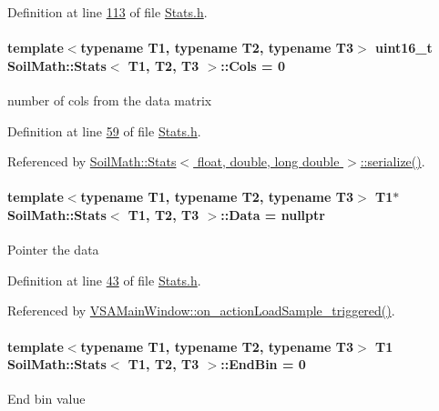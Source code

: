 Definition at line \hyperlink{_stats_8h_source_l00113}{113} of file \hyperlink{_stats_8h_source}{Stats.\+h}.

\hypertarget{class_soil_math_1_1_stats_a971f1ec23c32137805c4577f05454d83}{}
\paragraph[{Cols}]{\setlength{\rightskip}{0pt plus 5cm}template$<$typename T1, typename T2, typename T3$>$ uint16\+\_\+t {\bf Soil\+Math\+::\+Stats}$<$ T1, T2, T3 $>$\+::Cols = 0}\label{class_soil_math_1_1_stats_a971f1ec23c32137805c4577f05454d83}
number of cols from the data matrix 

Definition at line \hyperlink{_stats_8h_source_l00059}{59} of file \hyperlink{_stats_8h_source}{Stats.\+h}.



Referenced by \hyperlink{_stats_8h_source_l00651}{Soil\+Math\+::\+Stats$<$ float, double, long double $>$\+::serialize()}.

\hypertarget{class_soil_math_1_1_stats_affce366ceab8419a3f732e3c3a358f65}{}
\paragraph[{Data}]{\setlength{\rightskip}{0pt plus 5cm}template$<$typename T1, typename T2, typename T3$>$ T1$\ast$ {\bf Soil\+Math\+::\+Stats}$<$ T1, T2, T3 $>$\+::Data = nullptr}\label{class_soil_math_1_1_stats_affce366ceab8419a3f732e3c3a358f65}
Pointer the data 

Definition at line \hyperlink{_stats_8h_source_l00043}{43} of file \hyperlink{_stats_8h_source}{Stats.\+h}.



Referenced by \hyperlink{vsamainwindow_8cpp_source_l00475}{V\+S\+A\+Main\+Window\+::on\+\_\+action\+Load\+Sample\+\_\+triggered()}.

\hypertarget{class_soil_math_1_1_stats_a0db07157ff238d0d40c4e1f4d67afd46}{}
\paragraph[{End\+Bin}]{\setlength{\rightskip}{0pt plus 5cm}template$<$typename T1, typename T2, typename T3$>$ T1 {\bf Soil\+Math\+::\+Stats}$<$ T1, T2, T3 $>$\+::End\+Bin = 0}\label{class_soil_math_1_1_stats_a0db07157ff238d0d40c4e1f4d67afd46}
End bin value 

